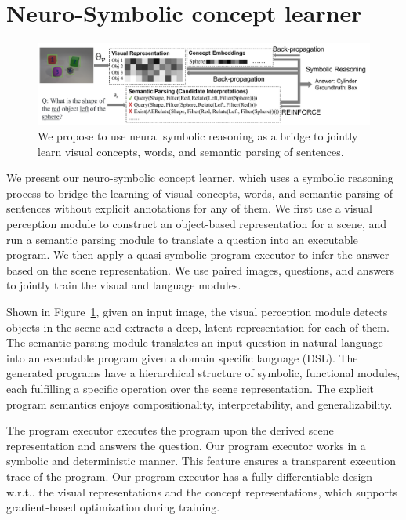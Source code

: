 \documentclass{article} %
\makeatletter
\newcommand{\fig}[1]{Figure~\ref{#1}}
\DeclareRobustCommand\onedot{\futurelet\@let@token\@onedot}
\def\@onedot{\ifx\@let@token.\else.\null\fi\xspace}
\def\wrt{w.r.t\onedot} \def\dof{d.o.f\onedot}
\newcommand{\modelfull}{neuro-symbolic concept learner\xspace}
\makeatother
\begin{document}
\section{Neuro-Symbolic concept learner}
%
\begin{figure}[t]
\centering
%
\includegraphics[width=\textwidth]{raw/Framework.pdf}
\caption{We propose to use neural symbolic reasoning as a bridge to jointly learn visual concepts, words, and semantic parsing of sentences.}
\vspace{-5pt}
\label{fig:framework}
\end{figure}
 
We present our \modelfull, which uses a symbolic reasoning process to bridge the learning of visual concepts, words, and semantic parsing of sentences without explicit annotations for any of them.
We first use a visual perception module to construct an object-based representation for a scene, and run a semantic parsing module to translate a question into an executable program. We then apply a quasi-symbolic program executor to infer the answer based on the scene representation. We use paired images, questions, and answers to jointly train the visual and language modules.

Shown in \fig{fig:framework}, given an input image, the visual perception module detects objects in the scene and extracts a deep, latent representation for each of them. The semantic parsing module translates an input question in natural language into an executable program given a domain specific language (DSL). The generated programs have a hierarchical structure of symbolic, functional modules, each fulfilling a specific operation over the scene representation. The explicit program semantics enjoys compositionality, interpretability, and generalizability.

%

%
The program executor executes the program upon the derived scene representation and answers the question. Our program executor works in a symbolic and deterministic manner.
This feature ensures a transparent execution trace of the program.
Our program executor has a fully differentiable design \wrt the visual representations and the concept representations, which supports gradient-based optimization during training.
%
\end{document}
